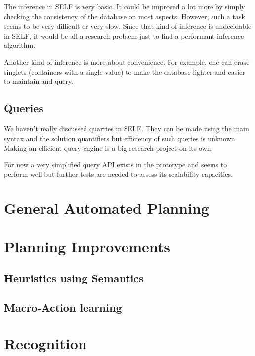 \documentclass[11pt,a4paper,twoside,openright,titlepage,numbers=noenddot,headinclude,cleardoublepage=empty,openany]{scrreprt}
\theoremstyle{plain}
\theoremstyle{definition}
\theoremstyle{remark}
\begin{document}
The inference in SELF is very basic. It could be improved a lot more by
simply checking the consistency of the database on most aspects.
However, such a task seems to be very difficult or very slow. Since that
kind of inference is undecidable in SELF, it would be all a research
problem just to find a performant inference algorithm.

Another kind of inference is more about convenience. For example, one
can erase singlets (containers with a single value) to make the database
lighter and easier to maintain and query.

\hypertarget{queries}{%
\subsection{Queries}\label{queries}}

We haven't really discussed quarries in SELF. They can be made using the
main syntax and the solution quantifiers but efficiency of such queries
is unknown. Making an efficient query engine is a big research project
on its own.

For now a very simplified query API exists in the prototype and seems to
perform well but further tests are needed to assess its scalability
capacities.

\hypertarget{general-automated-planning}{%
\section{General Automated Planning}\label{general-automated-planning}}

\hypertarget{planning-improvements}{%
\section{Planning Improvements}\label{planning-improvements}}

\hypertarget{heuristics-using-semantics}{%
\subsection{Heuristics using
Semantics}\label{heuristics-using-semantics}}

\hypertarget{macro-action-learning}{%
\subsection{Macro-Action learning}\label{macro-action-learning}}

\hypertarget{recognition}{%
\section{Recognition}\label{recognition}}
\end{document}
